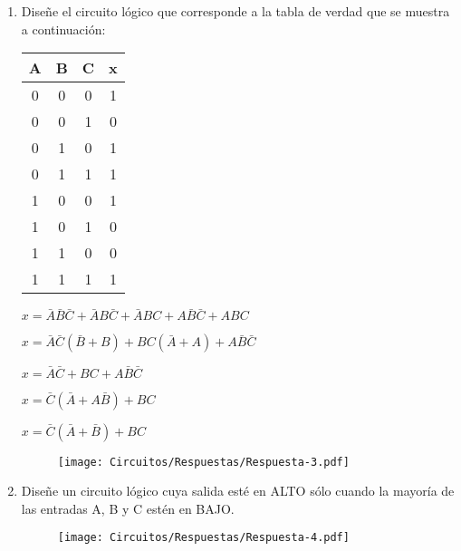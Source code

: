 \documentclass[a4paper, 12pt]{article}
\newcommand{\Pspace}{0.5cm}
\newcommand{\Aspace}{0.2cm}
\begin{document}
\begin{enumerate}
        \newpage
        \item Diseñe el circuito lógico que corresponde a la tabla de verdad que se muestra a continuación:
        \begin{center}
            \begin{tabular}{ccc|c}
                \textbf{A} & \textbf{B} & \textbf{C} & \textbf{x} \\
                \hline
                0 & 0 & 0 & 1 \\
                0 & 0 & 1 & 0 \\
                0 & 1 & 0 & 1 \\
                0 & 1 & 1 & 1 \\
                1 & 0 & 0 & 1 \\
                1 & 0 & 1 & 0 \\
                1 & 1 & 0 & 0 \\
                1 & 1 & 1 & 1
            \end{tabular}
        \end{center}
            \vspace{\Aspace} \par
            { \color{azul} 
                $x = \bar{A}\bar{B}\bar{C} + \bar{A}B\bar{C} + \bar{A}BC + A\bar{B}\bar{C} + ABC$
                \par $x = \bar{A}\bar{C}(\bar{B} + B) + BC(\bar{A} + A) + A\bar{B}\bar{C}$
                \par $x = \bar{A}\bar{C} + BC + A\bar{B}\bar{C}$
                \par $x = \bar{C}(\bar{A} + A\bar{B}) + BC$
                \par $x = \bar{C}(\bar{A} + \bar{B}) + BC$
                \begin{figure}[!ht]
                    \centering
                    \texttt{[image: Circuitos/Respuestas/Respuesta-3.pdf]}
                \end{figure}
            }



        \vspace{\Pspace}
        \item Diseñe un circuito lógico cuya salida esté en ALTO sólo cuando la mayoría de las entradas A, B y C estén en BAJO.
            \vspace{\Aspace} \par
            { \color{azul} 
                \begin{figure}[!ht]
                    \centering
                    \texttt{[image: Circuitos/Respuestas/Respuesta-4.pdf]}
                \end{figure}
            }




\end{enumerate}
\end{document}
